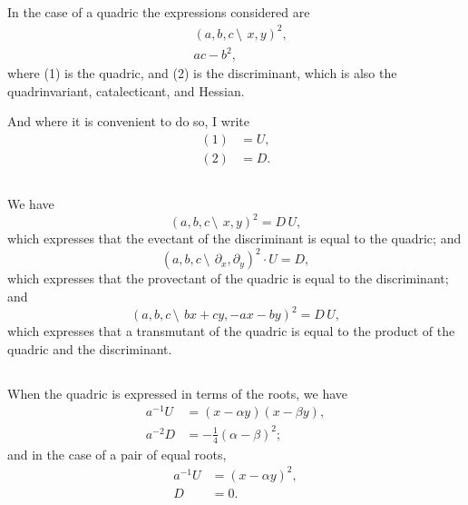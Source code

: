 \documentclass[11pt,a4paper]{book}
\begin{document}
\begin{center}
\setcounter{subsection}{91}

\subsection{}

In the case of a quadric the expressions considered are
\begin{align}
&(a, b, c\,\setminus\!\!\:\, x, y)^2, \tag{1}\\
&ac - b^2, \tag{2}
\end{align}
where (1) is the quadric, and (2) is the discriminant, which is also the quadrinvariant, catalecticant, and Hessian.

And where it is convenient to do so, I write
\begin{align*}
(1) &= U,\\
(2) &= D.
\end{align*}

\subsection{}

We have
\[
(a, b, c\,\setminus\!\!\:\, x, y)^2 = D\,U,
\]
which expresses that the evectant of the discriminant is equal to the quadric; and
\[
(a, b, c\,\setminus\!\!\:\, \partial_x, \partial_y)^2 \cdot U = D,
\]
which expresses that the provectant of the quadric is equal to the discriminant; and
\[
(a, b, c\,\setminus\!\!\:\, bx + cy, -ax - by)^2 = D\,U,
\]
which expresses that a transmutant of the quadric is equal to the product of the quadric and the discriminant.

\subsection{}

When the quadric is expressed in terms of the roots, we have
\begin{align*}
a^{-1}U &= (x - \alpha y)(x - \beta y),\\
a^{-2}D &= -\tfrac{1}{4}(\alpha - \beta)^2;
\end{align*}
and in the case of a pair of equal roots,
\begin{align*}
a^{-1}U &= (x - \alpha y)^2,\\
D &= 0.
\end{align*}

\subsection{}


\end{center}
\end{document}
